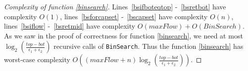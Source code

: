 \begin{proof}[Complexity of function \ref{binsearch}]
   Lines~\ref{bsifboteqtop} -~\ref{bsretbot} have complexity $O(1)$, lines~\ref{bsforcapset} -~\ref{bscapset} have
   complexity $O(n)$, lines~\ref{bsiflow} -~\ref{bsretmid} have complexity $O(maxFlow) + O(BinSearch)$. As we saw in the
   proof of correctness for function \ref{binsearch}, we need at most $\log_2(\frac{top - bot}{\epsilon_1 +
   \epsilon_2})$ recursive calls of \texttt{BinSearch}. Thus the function \ref{binsearch} has worst-case complexity
   $O((maxFlow + n)\log_2(\frac{top - bot}{\epsilon_1 + \epsilon_2}))$.
\end{proof}
